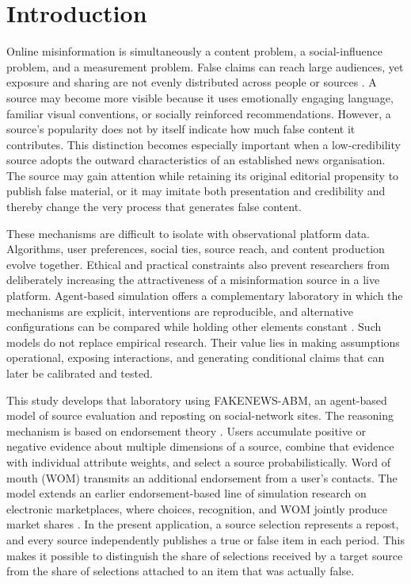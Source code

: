 \section{Introduction}
\label{sec:introduction}

Online misinformation is simultaneously a content problem, a social-influence problem, and a measurement problem. False claims can reach large audiences, yet exposure and sharing are not evenly distributed across people or sources \citep{lazer2018,vosoughi2018,grinberg2019,guess2019}. A source may become more visible because it uses emotionally engaging language, familiar visual conventions, or socially reinforced recommendations. However, a source's popularity does not by itself indicate how much false content it contributes. This distinction becomes especially important when a low-credibility source adopts the outward characteristics of an established news organisation. The source may gain attention while retaining its original editorial propensity to publish false material, or it may imitate both presentation and credibility and thereby change the very process that generates false content.

These mechanisms are difficult to isolate with observational platform data. Algorithms, user preferences, social ties, source reach, and content production evolve together. Ethical and practical constraints also prevent researchers from deliberately increasing the attractiveness of a misinformation source in a live platform. Agent-based simulation offers a complementary laboratory in which the mechanisms are explicit, interventions are reproducible, and alternative configurations can be compared while holding other elements constant \citep{macal2010,railsback2019}. Such models do not replace empirical research. Their value lies in making assumptions operational, exposing interactions, and generating conditional claims that can later be calibrated and tested.

This study develops that laboratory using FAKENEWS-ABM, an agent-based model of source evaluation and reposting on social-network sites. The reasoning mechanism is based on endorsement theory \citep{cohen1985}. Users accumulate positive or negative evidence about multiple dimensions of a source, combine that evidence with individual attribute weights, and select a source probabilistically. Word of mouth (WOM) transmits an additional endorsement from a user's contacts. The model extends an earlier endorsement-based line of simulation research on electronic marketplaces, where choices, recognition, and WOM jointly produce market shares \citep{teran2022,teran2024}. In the present application, a source selection represents a repost, and every source independently publishes a true or false item in each period. This makes it possible to distinguish the share of selections received by a target source from the share of selections attached to an item that was actually false.

